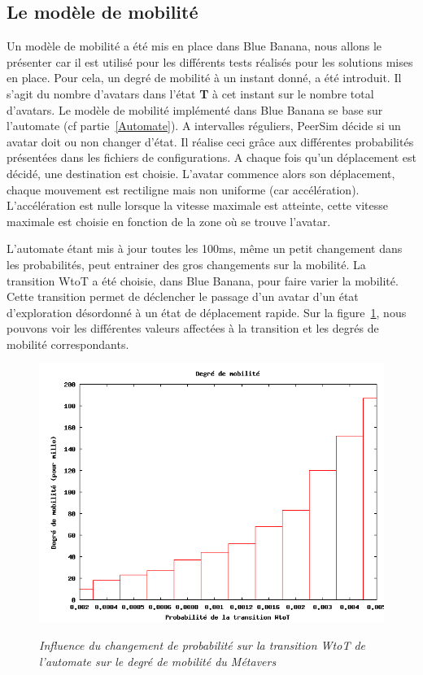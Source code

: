 \subsection{Le modèle de mobilité}

Un modèle de mobilité a été mis en place dans Blue Banana, nous allons le présenter car il est utilisé pour les différents tests réalisés pour les solutions mises en place. Pour cela, un degré de mobilité à un instant donné, a été introduit. Il s'agit du nombre d'avatars dans l'état \textbf{T} à cet instant sur le nombre total d'avatars. Le modèle de mobilité implémenté dans Blue Banana se base sur l'automate (cf partie~\ref{Automate}). A intervalles réguliers, PeerSim décide si un avatar doit ou non changer d'état. Il réalise ceci grâce aux différentes probabilités présentées dans les fichiers de configurations. A chaque fois qu'un déplacement est décidé, une destination est choisie. L'avatar commence alors son déplacement, chaque mouvement est rectiligne mais non uniforme (car accélération). L'accélération est nulle lorsque la vitesse maximale est atteinte, cette vitesse maximale est choisie en fonction de la zone où se trouve l'avatar.


\par L'automate étant mis à jour toutes les 100ms, même un petit changement dans les probabilités, peut entrainer des gros changements sur la mobilité. La transition WtoT a été choisie, dans Blue Banana, pour faire varier la mobilité. Cette transition permet de déclencher le passage d'un avatar d'un état d'exploration désordonné à un état de déplacement rapide. Sur la figure~\ref{fig:mobility}, nous pouvons voir les différentes valeurs affectées à la transition et les degrés de mobilité correspondants. 

\begin{figure}
  \begin{center}
    \includegraphics[scale=0.40]{./Ressources/Images/mobility.png} \\
    \caption{\textit{\small Influence du changement de probabilité sur
        la transition WtoT de l'automate sur le degré de mobilité du
        Métavers}}
    \label{fig:mobility}
  \end{center}
\end{figure}


